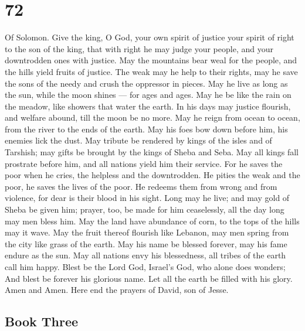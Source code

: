 \hypertarget{section-71}{%
\section{72}\label{section-71}}

Of Solomon.  Give the king, O God, your own spirit of
justice your spirit of right to the son of the king,  that
with right he may judge your people, and your downtrodden ones with
justice.  May the mountains bear weal for the people, and
the hills yield fruits of justice.  The weak may he help to
their rights, may he save the sons of the needy and crush the oppressor
in pieces.  May he live as long as the sun, while the moon
shines --- for ages and ages.  May he be like the rain on
the meadow, like showers that water the earth.  In his days
may justice flourish, and welfare abound, till the moon be no more.
 May he reign from ocean to ocean, from the river to the
ends of the earth.  May his foes bow down before him, his
enemies lick the dust.  May tribute be rendered by kings of
the isles and of Tarshish; may gifts be brought by the kings of Sheba
and Seba.  May all kings fall prostrate before him, and all
nations yield him their service.  For he saves the poor
when he cries, the helpless and the downtrodden.  He pities
the weak and the poor, he saves the lives of the poor.  He
redeems them from wrong and from violence, for dear is their blood in
his sight.  Long may he live; and may gold of Sheba be
given him; prayer, too, be made for him ceaselessly, all the day long
may men bless him.  May the land have abundance of corn, to
the tops of the hills may it wave. May the fruit thereof flourish like
Lebanon, may men spring from the city like grass of the earth.
 May his name be blessed forever, may his fame endure as
the sun. May all nations envy his blessedness, all tribes of the earth
call him happy.  Blest be the Lord God, Israel's God, who
alone does wonders;  And blest be forever his glorious
name. Let all the earth be filled with his glory. Amen and Amen.
 Here end the prayers of David, son of Jesse.

\hypertarget{book-three}{%
\subsection{Book Three}\label{book-three}}

